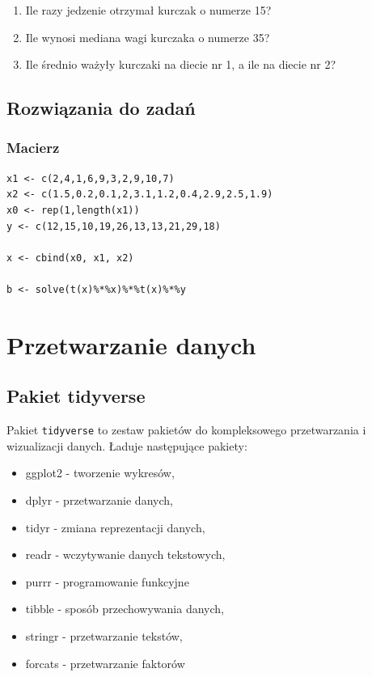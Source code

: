 \documentclass[]{book}
\providecommand{\tightlist}{%
  \setlength{\itemsep}{0pt}\setlength{\parskip}{0pt}}
\begin{document}
\begin{enumerate}
\def\labelenumi{\arabic{enumi}.}
\tightlist
\item
  Ile razy jedzenie otrzymał kurczak o numerze 15?
\item
  Ile wynosi mediana wagi kurczaka o numerze 35?
\item
  Ile średnio ważyły kurczaki na diecie nr 1, a ile na diecie nr 2?
\end{enumerate}

\section{Rozwiązania do zadań}\label{rozwiazania-do-zadan}

\subsection{Macierz}\label{macierz-1}

\begin{verbatim}
x1 <- c(2,4,1,6,9,3,2,9,10,7)
x2 <- c(1.5,0.2,0.1,2,3.1,1.2,0.4,2.9,2.5,1.9)
x0 <- rep(1,length(x1))
y <- c(12,15,10,19,26,13,13,21,29,18)

x <- cbind(x0, x1, x2)

b <- solve(t(x)%*%x)%*%t(x)%*%y
\end{verbatim}

\chapter{Przetwarzanie danych}\label{przetwarzanie-danych}

\section{Pakiet tidyverse}\label{pakiet-tidyverse}

Pakiet \texttt{tidyverse} to zestaw pakietów do kompleksowego
przetwarzania i wizualizacji danych. Ładuje następujące pakiety:

\begin{itemize}
\tightlist
\item
  ggplot2 - tworzenie wykresów,
\item
  dplyr - przetwarzanie danych,
\item
  tidyr - zmiana reprezentacji danych,
\item
  readr - wczytywanie danych tekstowych,
\item
  purrr - programowanie funkcyjne
\item
  tibble - sposób przechowywania danych,
\item
  stringr - przetwarzanie tekstów,
\item
  forcats - przetwarzanie faktorów
\end{itemize}
\end{document}
